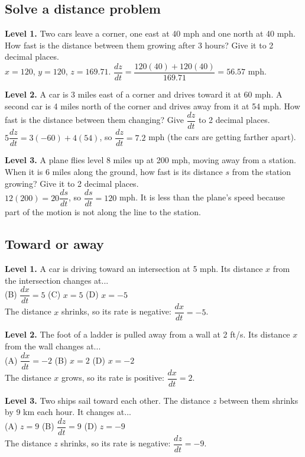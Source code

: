 \documentclass[11pt]{article}
\begin{document}
\subsection*{Solve a distance problem}
\noindent\textbf{Level 1.} Two cars leave a corner, one east at 40 mph and one north at 40 mph. How fast is the distance between them growing after 3 hours? Give it to 2 decimal places.\\  \quad $x=120$, $y=120$, $z=169.71$. $\dfrac{dz}{dt}=\dfrac{120(40)+120(40)}{169.71}=56.57$ mph.\par\medskip
\noindent\textbf{Level 2.} A car is 3 miles east of a corner and drives toward it at 60 mph. A second car is 4 miles north of the corner and drives away from it at 54 mph. How fast is the distance between them changing? Give $\dfrac{dz}{dt}$ to 2 decimal places.\\  \quad $5\dfrac{dz}{dt}=3(-60)+4(54)$, so $\dfrac{dz}{dt}=7.2$ mph (the cars are getting farther apart).\par\medskip
\noindent\textbf{Level 3.} A plane flies level 8 miles up at 200 mph, moving away from a station. When it is 6 miles along the ground, how fast is its distance $s$ from the station growing? Give it to 2 decimal places.\\  \quad $12(200)=20\dfrac{ds}{dt}$, so $\dfrac{ds}{dt}=120$ mph. It is less than the plane's speed because part of the motion is not along the line to the station.\par\medskip
\subsection*{Toward or away}
\noindent\textbf{Level 1.} A car is driving toward an intersection at 5 mph. Its distance $x$ from the intersection changes at...\\  \quad (B) $\dfrac{dx}{dt}=5$ \quad (C) $x=5$ \quad (D) $x=-5$\\  \quad The distance $x$ shrinks, so its rate is negative: $\dfrac{dx}{dt}=-5$.\par\medskip
\noindent\textbf{Level 2.} The foot of a ladder is pulled away from a wall at 2 ft/s. Its distance $x$ from the wall changes at...\\ (A) $\dfrac{dx}{dt}=-2$ \quad (B) $x=2$ \quad {} \quad (D) $x=-2$\\  \quad The distance $x$ grows, so its rate is positive: $\dfrac{dx}{dt}=2$.\par\medskip
\noindent\textbf{Level 3.} Two ships sail toward each other. The distance $z$ between them shrinks by 9 km each hour. It changes at...\\ (A) $z=9$ \quad (B) $\dfrac{dz}{dt}=9$ \quad {} \quad (D) $z=-9$\\  \quad The distance $z$ shrinks, so its rate is negative: $\dfrac{dz}{dt}=-9$.\par\medskip
\end{document}
